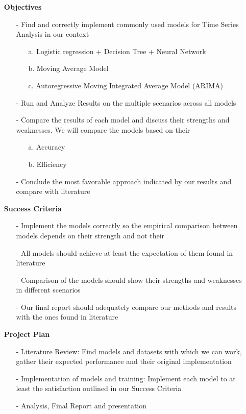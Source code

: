 \documentclass[12pt, letterpaper]{article}
\begin{document}
\begin{enumerate}
    \item [] \textbf{Objectives }
        \begin{itemize}
            \item[-] Find and correctly implement commonly used models for Time Series Analysis in our context
              \begin{itemize}
              \item [a.]Logistic regression + Decision Tree + Neural Network
              \item [b.]Moving Average Model
              \item [c.]Autoregressive Moving Integrated Average Model (ARIMA)
              \end{itemize}
            \item[-] Run and Analyze Results on the multiple scenarios across all models
            \item[-] Compare the results of each model and discuss their strengths and weaknesses. We will compare the models based on their
              \begin{itemize}
                \item [a.] Accuracy
                \item [b.] Efficiency
              \end{itemize}
            \item[-] Conclude the most favorable approach indicated by our results and compare with literature
        \end{itemize} 
    \item [] \textbf{Success Criteria}
        \begin{itemize}
            \item [-] Implement the models correctly so the empirical comparison between models depends on their strength and not their
            \item [-] All models should achieve at least the expectation of them found in literature
            \item [-] Comparison of the models should show their strengths and weaknesses in different scenarios
            \item [-] Our final report should adequately compare our methods and results with the ones found in literature
        \end{itemize}
        
    \item [] \textbf{Project Plan} %
        \begin{itemize}
            \item [-] Literature Review: Find models and datasets with which we can work, gather their expected performance and their original implementation
            \item [-] Implementation of models and training: Implement each model to at least the satisfaction outlined in our Success Criteria
            \item [-] Analysis, Final Report and presentation
        \end{itemize}
    

\end{enumerate}
\end{document}
